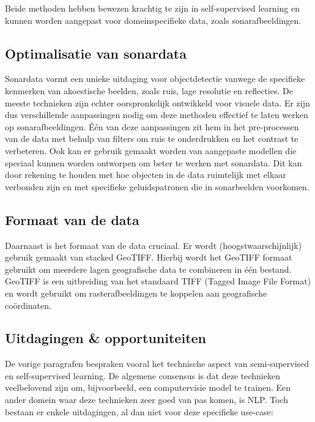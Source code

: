 Beide methoden hebben bewezen krachtig te zijn in self-supervised learning en kunnen worden aangepast voor domeinspecifieke data, zoals sonarafbeeldingen.

\subsection{Optimalisatie van sonardata}

Sonardata vormt een unieke uitdaging voor objectdetectie vanwege de specifieke kenmerken van akoestische beelden, zoals ruis, lage resolutie en reflecties. De meeste technieken zijn echter oorspronkelijk ontwikkeld voor visuele data. Er zijn dus verschillende aanpassingen nodig om deze methoden effectief te laten werken op sonarafbeeldingen. Één van deze aanpassingen zit hem in het pre-processen van de data met behulp van filters om ruis te onderdrukken en het contrast te verbeteren. Ook kan er gebruik gemaakt worden van aangepaste modellen die speciaal kunnen worden ontworpen om beter te werken met sonardata. Dit kan door rekening te houden met hoe objecten in de data ruimtelijk met elkaar verbonden zijn en met specifieke geluidspatronen die in sonarbeelden voorkomen. \autocite{Karimanzira_2020}

\subsection{Formaat van de data}

Daarnaast is het formaat van de data cruciaal. Er wordt (hoogstwaarschijnlijk) gebruik gemaakt van stacked GeoTIFF. Hierbij wordt het GeoTIFF formaat gebruikt om meerdere lagen geografische data te combineren in één bestand. GeoTIFF is een uitbreiding van het standaard TIFF (Tagged Image File Format) en wordt gebruikt om rasterafbeeldingen te koppelen aan geografische coördinaten. \autocite{Ritter_1997}

\subsection{Uitdagingen \& opportuniteiten}

De vorige paragrafen bespraken vooral het technische aspect van semi-supervised en self-supervised learning. De algemene consensus is dat deze technieken veelbelovend zijn om, bijvoorbeeld, een computervisie model te trainen. Een ander domein waar deze technieken zeer goed van pas komen, is NLP. Toch bestaan er enkele uitdagingen, al dan niet voor deze specifieke use-case:

